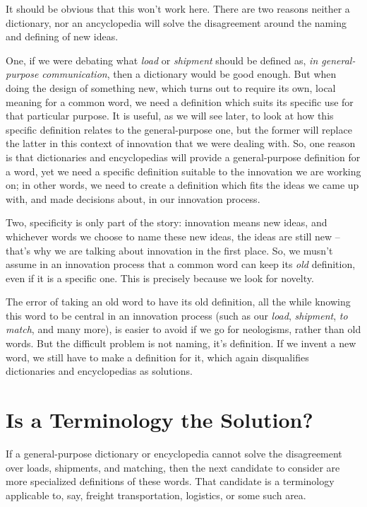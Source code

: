 \documentclass[graybox,envcountchap,sectrefs]{svmono}
\begin{document}
It should be obvious that this won't work here. There are two reasons neither a dictionary, nor an ancyclopedia will solve the disagreement around the naming and defining of new ideas.

One, if we were debating what \textit{load} or \textit{shipment} should be defined as, \textit{in general-purpose communication}, then a dictionary would be good enough. But when doing the design of something new, which turns out to require its own, local meaning for a common word, we need a definition which suits its specific use for that particular purpose. It is useful, as we will see later, to look at how this specific definition relates to the general-purpose one, but the former will replace the latter in this context of innovation that we were dealing with. So, one reason is that dictionaries and encyclopedias will provide a general-purpose definition for a word, yet we need a specific definition suitable to the innovation we are working on; in other words, we need to create a definition which fits the ideas we came up with, and made decisions about, in our innovation process.

Two, specificity is only part of the story: innovation means new ideas, and whichever words we choose to name these new ideas, the ideas are still new -- that's why we are talking about innovation in the first place. So, we musn't assume in an innovation process that a common word can keep its \textit{old} definition, even if it is a specific one. This is precisely because we look for novelty. 

The error of taking an old word to have its old definition, all the while knowing this word to be central in an innovation process (such as our \textit{load}, \textit{shipment}, \textit{to match}, and many more), is easier to avoid if we go for neologisms, rather than old words. But the difficult problem is not naming, it's definition. If we invent a new word, we still have to make a definition for it, which again disqualifies dictionaries and encyclopedias as solutions. 


\section{Is a Terminology the Solution?}\label{s:terminology-1}
If a general-purpose dictionary or encyclopedia cannot solve the disagreement over loads, shipments, and matching, then the next candidate to consider are more specialized definitions of these words. That candidate is a terminology applicable to, say, freight transportation, logistics, or some such area.
\end{document}
